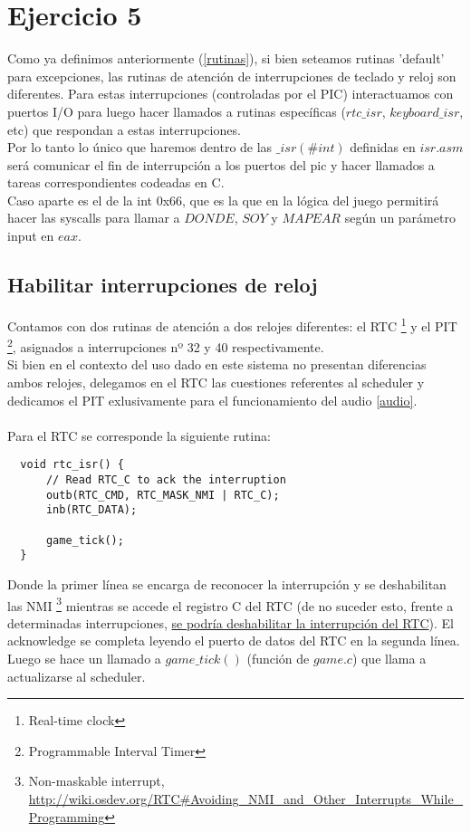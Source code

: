 \section{Ejercicio 5}
Como ya definimos anteriormente (\ref{rutinas}), si bien seteamos rutinas 'default' para excepciones, las rutinas de atención de interrupciones de teclado y reloj son diferentes.
Para estas interrupciones (controladas por el PIC) interactuamos con puertos I/O para luego hacer llamados a rutinas específicas ($rtc\_isr$, $keyboard\_isr$, etc) que respondan a estas interrupciones.
\\Por lo tanto lo único que haremos dentro de las $\_isr(\# int)$ definidas en $isr.asm$ será comunicar el fin de interrupción a los puertos del pic y hacer llamados a tareas correspondientes codeadas en C.
\\Caso aparte es el de la int 0x66, que es la que en la lógica del juego permitirá hacer las syscalls para llamar a $DONDE$, $SOY$ y $MAPEAR$ según un parámetro input en $eax$.

\subsection{Habilitar interrupciones de reloj}
Contamos con dos rutinas de atención a dos relojes diferentes: el RTC \footnote{Real-time clock } y el PIT \footnote{Programmable Interval Timer}, asignados a interrupciones nº 32 y 40 respectivamente. \\
Si bien en el contexto del uso dado en este sistema no presentan diferencias ambos relojes, delegamos en el RTC las cuestiones referentes al scheduler y dedicamos el PIT exlusivamente para el funcionamiento del audio \ref{audio}.
\\
\\
Para el RTC se corresponde la siguiente rutina:

\begin{lstlisting}
  void rtc_isr() {
      // Read RTC_C to ack the interruption
      outb(RTC_CMD, RTC_MASK_NMI | RTC_C);
      inb(RTC_DATA);

      game_tick();
  }
\end{lstlisting}

Donde la primer línea se encarga de reconocer la interrupción y se deshabilitan las NMI
\footnote{Non-maskable interrupt, \url{http://wiki.osdev.org/RTC\#Avoiding_NMI_and_Other_Interrupts_While_Programming}} mientras se accede el registro C del RTC (de no suceder esto, frente a determinadas interrupciones,
\href{http://wiki.osdev.org/RTC\#Interrupts_and_Register_C}{se podría deshabilitar la interrupción del RTC}). El acknowledge se completa leyendo el puerto de datos del RTC en la segunda línea. \\
Luego se hace un llamado a $game\_tick()$ (función de $game.c$) que llama a actualizarse al scheduler.



